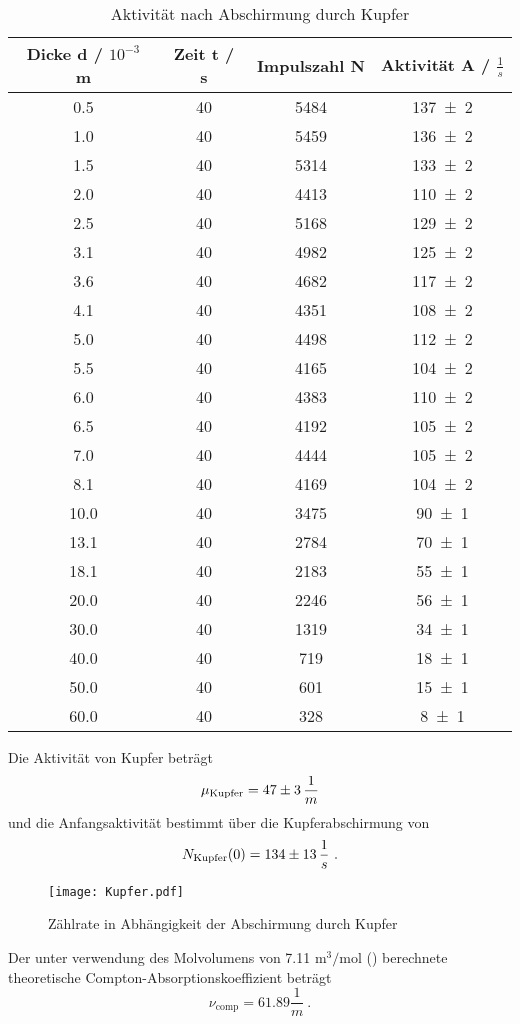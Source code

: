 \begin{table}
  \centering
  \begin{tabular}{c c c c}
    \toprule
    Dicke d / $10^{-3}$ m & Zeit t / s & Impulszahl N & Aktivität A / $\frac{1}{s}$ \\
    \midrule
    0.5		&40	&5484&	\num{137 +- 2} \\
    1.0		&40	&5459&	\num{136 +- 2} \\
    1.5		&40	&5314&	\num{133 +- 2} \\
    2.0		&40	&4413&	\num{110 +- 2} \\
    2.5		&40	&5168&	\num{129 +- 2} \\
    3.1		&40	&4982&	\num{125 +- 2} \\
    3.6		&40	&4682&	\num{117 +- 2} \\
    4.1		&40	&4351&	\num{108 +- 2} \\
    5.0		&40	&4498&	\num{112 +- 2} \\
    5.5		&40	&4165&	\num{104 +- 2} \\
    6.0		&40	&4383&	\num{110 +- 2} \\
    6.5		&40	&4192&	\num{105 +- 2} \\
    7.0		&40	&4444&	\num{105 +- 2} \\
    8.1		&40	&4169&	\num{104 +- 2} \\
    10.0	&40	&3475&	\num{90 +- 1} \\
    13.1	&40 	&2784&	\num{70 +- 1} \\
    18.1	&40	&2183&	\num{55 +- 1} \\
    20.0	&40	&2246&	\num{56 +- 1} \\
    30.0	&40 	&1319&	\num{34 +- 1} \\
    40.0    	&40 	&719&	\num{18 +- 1} \\
    50.0    	&40 	&601&	\num{15 +- 1} \\
    60.0	&40 	&328&	\num{8 +- 1} \\
    \bottomrule
  \end{tabular}
  \caption{Aktivität nach Abschirmung durch Kupfer}
  \label{tab:AKupfer}
\end{table}
Die Aktivität von Kupfer beträgt
\begin{equation}
  \mu_\text{Kupfer} = \num{ 47 +- 3 } \, \frac{1}{m}
  \label{eqn:muku}
\end{equation}
und die Anfangsaktivität bestimmt über die Kupferabschirmung von
\begin{equation}
  N_\text{Kupfer}(0) = \num{134 +- 13} \, \frac{1}{s} \ .
  \label{eqn:NKu}
\end{equation}
\begin{figure}
  \centering
  \texttt{[image: Kupfer.pdf]}
  \caption{Zählrate in Abhängigkeit der Abschirmung durch Kupfer}
  \label{fig:Kupfer}
\end{figure}
Der unter verwendung des Molvolumens von 7.11 $\text{m}^3 / $mol (\cite{Kupfer}) berechnete theoretische Compton-Absorptionskoeffizient beträgt
\begin{equation}
  \nu_\text{comp} = 61.89 \frac{1}{m} \ .
  \label{eqn:Kc}
\end{equation}
